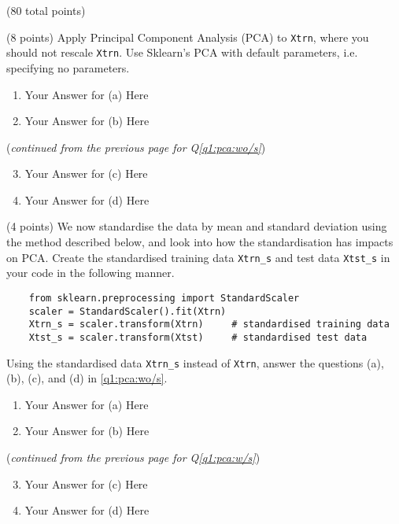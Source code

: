 \documentclass[12pt]{article}
\begin{document}
\begin{question}{(80 total points) \qOneTitle}
\begin{subquestion}{(8 points)
    Apply Principal Component Analysis (PCA) to {\tt Xtrn}, where you should not rescale {\tt Xtrn}.
    Use Sklearn's PCA with default parameters, i.e. specifying no parameters.
  }
  \begin{answerbox}{0.5\textheight}
    \begin{enumerate}
    \item Your Answer for (a) Here
    \item Your Answer for (b) Here
    \end{enumerate}
  \end{answerbox}
  \clearpage
  ({\it continued from the previous page for Q\ref{q1:pca:wo/s}})
  \begin{answerbox}{0.6\textheight}
    \begin{enumerate}\setcounter{enumi}{2}
    \item Your Answer for (c) Here
    \item Your Answer for (d) Here
    \end{enumerate}
  \end{answerbox}
    


\end{subquestion}

\begin{subquestion}{(4 points) %
    We now standardise the data by mean and standard deviation using the method described below, and look into how the standardisation has impacts on PCA.
  }\label{q1:pca:w/s}
  Create the standardised training data {\tt Xtrn\_s} and test data {\tt Xtst\_s} in your code in the following manner.
  \begin{lstlisting}
    from sklearn.preprocessing import StandardScaler
    scaler = StandardScaler().fit(Xtrn)
    Xtrn_s = scaler.transform(Xtrn)     # standardised training data
    Xtst_s = scaler.transform(Xtst)     # standardised test data
   \end{lstlisting}
   Using the standardised data {\tt Xtrn\_s} instead of {\tt Xtrn}, 
   answer the questions (a), (b), (c), and (d) in \ref{q1:pca:wo/s}.


  \begin{answerbox}{0.5\textheight}
    \begin{enumerate}
    \item Your Answer for (a) Here
    \item Your Answer for (b) Here
    \end{enumerate}
  \end{answerbox}
  \clearpage
  ({\it continued from the previous page for Q\ref{q1:pca:w/s}})
  \begin{answerbox}{0.6\textheight}
    \begin{enumerate}\setcounter{enumi}{2}
    \item Your Answer for (c) Here
    \item Your Answer for (d) Here
    \end{enumerate}
  \end{answerbox}
  



\end{subquestion}
\end{question}
\end{document}
